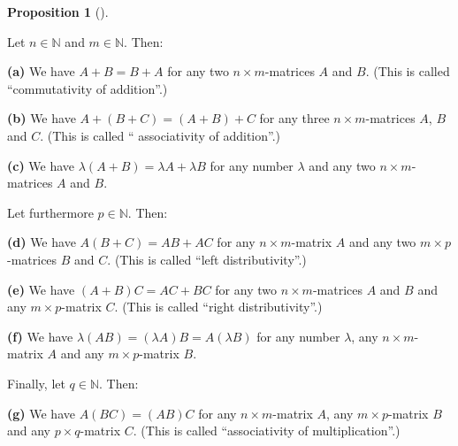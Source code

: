 \documentclass[numbers=enddot,12pt,final,onecolumn,notitlepage]{scrartcl}%
\theoremstyle{definition}
\newtheorem{prop}[theo]{Proposition}
\newenvironment{proposition}[1][]
{\begin{prop}[#1]\begin{leftbar}}
{\end{leftbar}\end{prop}}
\begin{document}
\begin{proposition}
\label{prop.matrix-laws.1}Let $n\in\mathbb{N}$ and $m\in\mathbb{N}$. Then:

\textbf{(a)} We have $A+B=B+A$ for any two $n\times m$-matrices $A$ and $B$.
(This is called \textquotedblleft commutativity of addition\textquotedblright.)

\textbf{(b)} We have $A+\left(  B+C\right)  =\left(  A+B\right)  +C$ for any
three $n\times m$-matrices $A$, $B$ and $C$. (This is called \textquotedblleft
associativity of addition\textquotedblright.)

\textbf{(c)} We have $\lambda\left(  A+B\right)  =\lambda A+\lambda B$ for any
number $\lambda$ and any two $n\times m$-matrices $A$ and $B$.

Let furthermore $p\in\mathbb{N}$. Then:

\textbf{(d)} We have $A\left(  B+C\right)  =AB+AC$ for any $n\times m$-matrix
$A$ and any two $m\times p$-matrices $B$ and $C$. (This is called
\textquotedblleft left distributivity\textquotedblright.)

\textbf{(e)} We have $\left(  A+B\right)  C=AC+BC$ for any two $n\times
m$-matrices $A$ and $B$ and any $m\times p$-matrix $C$. (This is called
\textquotedblleft right distributivity\textquotedblright.)

\textbf{(f)} We have $\lambda\left(  AB\right)  =\left(  \lambda A\right)
B=A\left(  \lambda B\right)  $ for any number $\lambda$, any $n\times
m$-matrix $A$ and any $m\times p$-matrix $B$.

Finally, let $q\in\mathbb{N}$. Then:

\textbf{(g)} We have $A\left(  BC\right)  =\left(  AB\right)  C$ for any
$n\times m$-matrix $A$, any $m\times p$-matrix $B$ and any $p\times q$-matrix
$C$. (This is called \textquotedblleft associativity of
multiplication\textquotedblright.)
\end{proposition}
\end{document}
